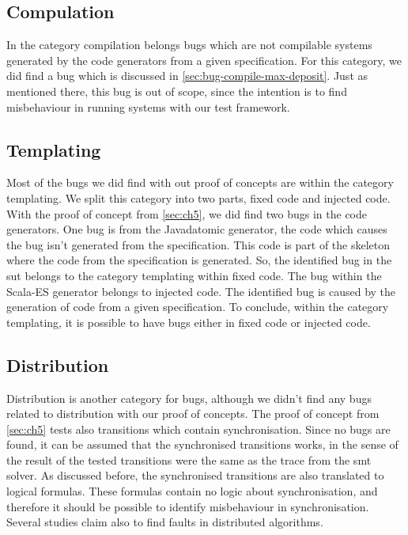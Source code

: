 \subsection{Compulation}
In the category compilation belongs bugs which are not compilable systems generated by the code generators from a given specification. For this category, we did find a bug which is discussed in \autoref{sec:bug-compile-max-deposit}. Just as mentioned there, this bug is out of scope, since the intention is to find misbehaviour in running systems with our test framework.

\subsection{Templating}
Most of the bugs we did find with out proof of concepts are within the category templating. We split this category into two parts, fixed code and injected code. With the proof of concept from \autoref{sec:ch5}, we did find two bugs in the code generators. One bug is from the Javadatomic generator, the code which causes the bug isn't generated from the specification. This code is part of the skeleton where the code from the specification is generated. So, the identified bug in the \gls{sut} belongs to the category templating within fixed code. The bug within the Scala-ES generator belongs to injected code. The identified bug is caused by the generation of code from a given specification. To conclude, within the category templating, it is possible to have bugs either in fixed code or injected code.

\subsection{Distribution}
Distribution is another category for bugs, although we didn't find any bugs related to distribution with our proof of concepts. The proof of concept from \autoref{sec:ch5} tests also transitions which contain synchronisation. Since no bugs are found, it can be assumed that the synchronised transitions works, in the sense of the result of the tested transitions were the same as the trace from the \gls{smt} solver. As discussed before, the synchronised transitions are also translated to logical formulas. These formulas contain no logic about synchronisation, and therefore it should be possible to identify misbehaviour in synchronisation. Several studies claim also to find faults in distributed algorithms.

